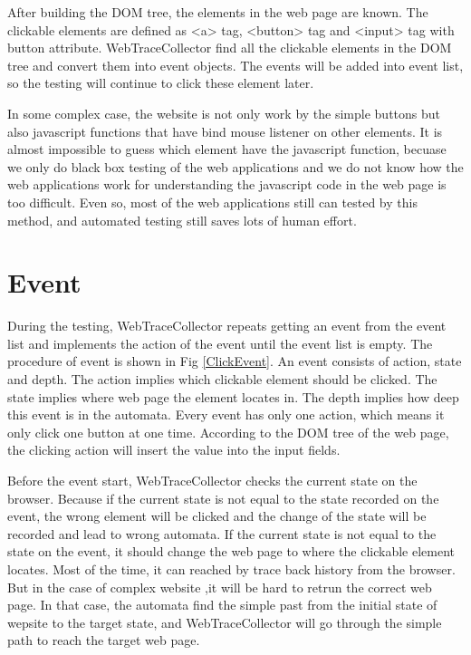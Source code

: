 After building the DOM tree, the elements in the web page are known.
The clickable elements are defined as <a> tag, <button> tag and <input> tag with button attribute. 
WebTraceCollector find all the clickable elements in the DOM tree
and convert them into event objects.
The events will be added into event list,
so the testing will continue to click these element later.

In some complex case, the website is not only work by the simple buttons 
but also javascript functions that have bind mouse listener on other elements.
It is almost impossible to guess which element have the javascript function,
becuase we only do black box testing of the web applications 
and we do not know how the web applications work 
for understanding the javascript code in the web page is too difficult.
Even so, most of the web applications still can tested by this method,
and automated testing still saves lots of human effort.

\clearpage

\section{Event}

During the testing, WebTraceCollector repeats getting an event from the event list 
and implements the action of the event until the event list is empty.
The procedure of event is shown in Fig \ref{ClickEvent}.
An event consists of action, state and depth.
The action implies which clickable element should be clicked.
The state implies where web page the element locates in.
The depth implies how deep this event is in the automata.
Every event has only one action, which means it only click one button at one time.
According to the DOM tree of the web page, the clicking action will insert the value into the input fields.

Before the event start, 
WebTraceCollector checks the current state on the browser.
Because if the current state is not equal to the state recorded on the event,
the wrong element will be clicked and the change of the state will be recorded and lead to wrong automata.
If the current state is not equal to the state on the event, 
it should change the web page to where the clickable element locates.
Most of the time, it can reached by trace back history from the browser.
But in the case of complex website ,it will be hard to retrun the correct web page.
In that case, the automata find the simple past from the initial state of wepsite to the target state,
and WebTraceCollector will go through the simple path to reach the target web page.

